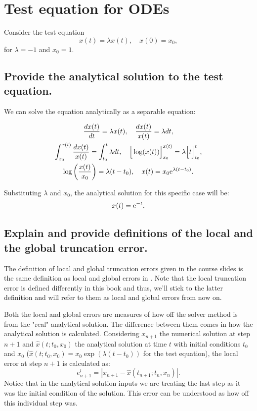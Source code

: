 \section{Test equation for ODEs} \label{part1}
Consider the test equation
\begin{equation} \label{test_equation}
    \dot{x}(t) = \lambda x(t), \quad x(0) = x_0,
\end{equation}
for $\lambda=-1$ and $x_0 = 1$.

\subsection{Provide the analytical solution to the test equation.}
We can solve the equation analytically as a separable equation:

\begin{gather*}
    \frac{d x(t)}{dt} = \lambda x(t), \quad \frac{dx(t)}{x(t)} = \lambda dt, \\
    \int_{x_0}^{x(t)} \frac{dx(t)}{x(t)} = \int_{t_0} ^t\lambda dt, \quad \Big[ \log(x(t)) \Big]_{x_0}^{x(t)} = \lambda \Big[t \Big]_{t_0}^t, \\
    \log \left( \frac{x(t)}{x_0} \right) = \lambda (t - t_0), \quad x(t) = x_0 \mathrm{e}^{\lambda (t - t_0)}.
\end{gather*}

Substituting $\lambda$ and $x_0$, the analytical solution for this specific case will be:
\begin{equation*}
    x(t) = \mathrm{e} ^{-t}.
\end{equation*}


\subsection{Explain and provide definitions of the local and the global truncation error.}
The definition of local and global truncation errors given in the course slides is the same definition as local and global errors in \cite{Ascher-Petzold}. Note that the local truncation error is defined differently in this book and thus, we'll stick to the latter definition and will refer to them as local and global errors from now on.

Both the local and global errors are measures of how off the solver method is from the "real" analytical solution. The difference between them comes in how the analytical solution is calculated. Considering $x_{n+1}$ the numerical solution at step $n+1$ and $\hat{x}(t; t_0, x_0)$ the analytical solution at time $t$ with initial conditions $t_0$ and $x_0$ ($\hat{x}(t; t_0, x_0) = x_0\exp(\lambda (t-t_0))$ for the test equation), the local error at step $n+1$ is calculated as:
\begin{equation*}
    e_{n+1}^{l} = \left| x_{n+1} - \hat{x}(t_{n+1};t_n,x_n) \right|.
\end{equation*}
Notice that in the analytical solution inputs we are treating the last step as it was the initial condition of the solution. This error can be understood as how off this individual step was. 

